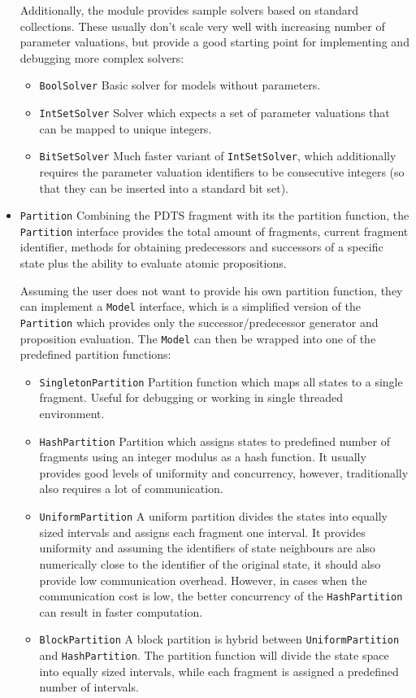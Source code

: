 \begin{itemize}
	Additionally, the module provides sample solvers based on standard collections. These usually don't scale very well with increasing number of parameter valuations, but provide a good starting point for implementing and debugging more complex solvers:
	
	\begin{itemize}
		\item \texttt{BoolSolver} Basic solver for models without parameters.
		\item \texttt{IntSetSolver} Solver which expects a set of parameter valuations that can be mapped to unique integers.
		\item \texttt{BitSetSolver} Much faster variant of \texttt{IntSetSolver}, which additionally requires the parameter valuation identifiers to be consecutive integers (so that they can be inserted into a standard bit set).
	\end{itemize}
	
	\item \texttt{Partition} Combining the \ac{PDTS} fragment with its the partition function, the \texttt{Partition} interface provides the total amount of fragments, current fragment identifier, methods for obtaining predecessors and successors of a specific state plus the ability to evaluate atomic propositions.
	
	Assuming the user does not want to provide his own partition function, they can implement a \texttt{Model} interface, which is a simplified version of the \texttt{Partition} which provides only the successor/predecessor generator and proposition evaluation. The \texttt{Model} can then be wrapped into one of the predefined partition functions:
	
	\begin{itemize}
		\item \texttt{SingletonPartition} Partition function which maps all states to a single fragment. Useful for debugging or working in single threaded environment.
		\item \texttt{HashPartition} Partition which assigns states to predefined number of fragments using an integer modulus as a hash function. It usually provides good levels of uniformity and concurrency, however, traditionally also requires a lot of communication.
		\item \texttt{UniformPartition} A uniform partition divides the states into equally sized intervals and assigns each fragment one interval. It provides uniformity and assuming the identifiers of state neighbours are also numerically close to the identifier of the original state, it should also provide low communication overhead. However, in cases when the communication cost is low, the better concurrency of the \texttt{HashPartition} can result in faster computation.
		\item \texttt{BlockPartition} A block partition is hybrid between \texttt{UniformPartition} and \texttt{HashPartition}. The partition function will divide the state space into equally sized intervals, while each fragment is assigned a predefined number of intervals.
	\end{itemize}


\end{itemize}
